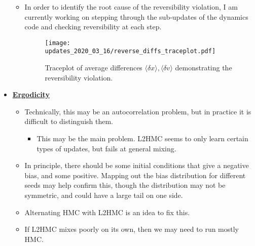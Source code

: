 \begin{itemize}
\begin{itemize}
      \color{black}
    \item In order to identify the root cause of the reversibility violation, I
      am currently working on stepping through the sub-updates of the dynamics
      code and checking reversibility at each step.
      \begin{figure}[htpb!]
        \centering
        \texttt{[image: updates\_2020\_03\_16/reverse\_diffs\_traceplot.pdf]}
        \caption{Traceplot of average differences \(\langle \delta x\rangle,
          \langle \delta v\rangle\) demonstrating the reversibility
        violation.}%
        \label{fig:reverse_diffs}
      \end{figure}
  \end{itemize}
  \item \textbf{\uline{Ergodicity}}
    \begin{itemize}
      \item Technically, this may be an autocorrelation problem, but in
        practice it is difficult to distinguish them.
        \begin{itemize}
          \item This may be the main problem. L2HMC seems to only learn certain
            types of updates, but fails at general mixing.
        \end{itemize}
      \item \textbf{\color{red}{(AI3)}} In principle, there should be some initial conditions that
        give a negative bias, and some positive. Mapping out the bias distribution
        for different seeds may help confirm this, though the distribution may not
        be symmetric, and could have a large tail on one side.
      \item \textbf{\color{red}{(AI4)}} Alternating HMC with L2HMC is an idea to fix this.
      \item If L2HMC mixes poorly on its own, then we may need to run mostly HMC.\@

\end{itemize}
\end{itemize}
